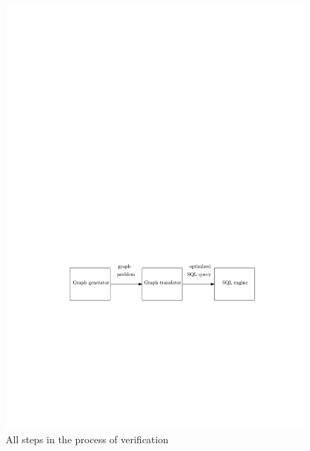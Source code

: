 \begin{figure}
	\includegraphics{figures/process.pdf}
	\caption{All steps in the process of verification}
	\label{fig:process}
\end{figure}